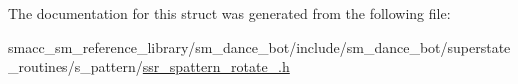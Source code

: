 The documentation for this struct was generated from the following file\+:\begin{DoxyCompactItemize}
\item 
smacc\+\_\+sm\+\_\+reference\+\_\+library/sm\+\_\+dance\+\_\+bot/include/sm\+\_\+dance\+\_\+bot/superstate\+\_\+routines/s\+\_\+pattern/\hyperlink{ssr__spattern__rotate__4_8h}{ssr\+\_\+spattern\+\_\+rotate\+\_.\+h}\end{DoxyCompactItemize}
